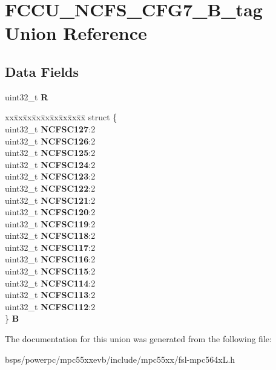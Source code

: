 \hypertarget{unionFCCU__NCFS__CFG7__32B__tag}{}\section{F\+C\+C\+U\+\_\+\+N\+C\+F\+S\+\_\+\+C\+F\+G7\+\_\+B\+\_\+tag Union Reference}
\label{unionFCCU__NCFS__CFG7__32B__tag}
\subsection*{Data Fields}
\begin{DoxyCompactItemize}
\item 
\mbox{\label{unionFCCU__NCFS__CFG7__32B__tag_add38b01ac8532a67a39b5725242e08bb}} 
uint32\+\_\+t {\bfseries R}
\item 
\mbox{\label{unionFCCU__NCFS__CFG7__32B__tag_a852689140b10f62f80f14790fd616288}} 
\begin{tabbing}
xx\=xx\=xx\=xx\=xx\=xx\=xx\=xx\=xx\=\kill
struct \{\\
\>uint32\_t {\bfseries NCFSC127}:2\\
\>uint32\_t {\bfseries NCFSC126}:2\\
\>uint32\_t {\bfseries NCFSC125}:2\\
\>uint32\_t {\bfseries NCFSC124}:2\\
\>uint32\_t {\bfseries NCFSC123}:2\\
\>uint32\_t {\bfseries NCFSC122}:2\\
\>uint32\_t {\bfseries NCFSC121}:2\\
\>uint32\_t {\bfseries NCFSC120}:2\\
\>uint32\_t {\bfseries NCFSC119}:2\\
\>uint32\_t {\bfseries NCFSC118}:2\\
\>uint32\_t {\bfseries NCFSC117}:2\\
\>uint32\_t {\bfseries NCFSC116}:2\\
\>uint32\_t {\bfseries NCFSC115}:2\\
\>uint32\_t {\bfseries NCFSC114}:2\\
\>uint32\_t {\bfseries NCFSC113}:2\\
\>uint32\_t {\bfseries NCFSC112}:2\\
\} {\bfseries B}\\

\end{tabbing}\end{DoxyCompactItemize}


The documentation for this union was generated from the following file\+:\begin{DoxyCompactItemize}
\item 
bsps/powerpc/mpc55xxevb/include/mpc55xx/fsl-\/mpc564x\+L.\+h\end{DoxyCompactItemize}
